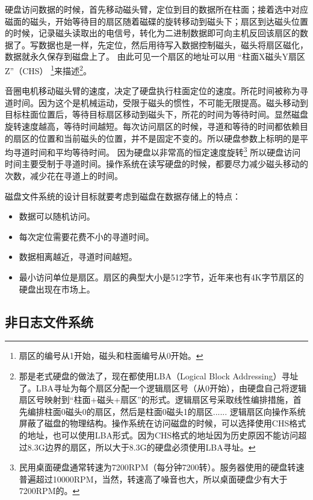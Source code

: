 
硬盘访问数据的时候，首先移动磁头臂，定位到目的数据所在柱面；接着选中对应磁面的磁头，开始等待目的扇区随着磁碟的旋转移动到磁头下；扇区到达磁头位置的时候，记录磁头读取出的电信号，转化为二进制数据即可向主机反回该扇区的数据了。写数据也是一样，先定位，然后用待写入数据控制磁头，磁头将扇区磁化，数据就永久保存到磁盘上了。
由此可见一个扇区的地址可以用 “柱面X磁头Y扇区Z”（CHS） \footnote{扇区的编号从1开始，磁头和柱面编号从0开始。}来描述\footnote{那是老式硬盘的做法了，现在都使用LBA（Logical Block Addressing）寻址了。LBA寻址为每个扇区分配一个逻辑扇区号（从0开始），由硬盘自己将逻辑扇区号映射到“柱面+磁头+扇区”的形式。逻辑扇区号采取线性编排措施，首先编排柱面0磁头0的扇区，然后是柱面0磁头1的扇区...... 逻辑扇区向操作系统屏蔽了磁盘的物理结构。操作系统在访问磁盘的时候，可以选择使用CHS格式的地址，也可以使用LBA形式。因为CHS格式的地址因为历史原因不能访问超过8.3G边界的扇区，所以大于8.3G的硬盘必须使用LBA寻址。}。


音圈电机移动磁头臂的速度，决定了硬盘执行柱面定位的速度。所花时间被称为寻道时间。因为这个是机械运动，受限于磁头的惯性，不可能无限提高。磁头移动到目标柱面位置后，等待目标扇区移动到磁头下，所花的时间为等待时间。显然磁盘旋转速度越高，等待时间越短。每次访问扇区的时候，寻道和等待的时间都依赖目的扇区的位置和当前磁头的位置，并不是固定不变的。所以硬盘参数上标明的是平均寻道时间和平均等待时间。
因为硬盘以非常高的恒定速度旋转\footnote{民用桌面硬盘通常转速为7200RPM（每分钟7200转）。服务器使用的硬盘转速普遍超过10000RPM，当然，转速高了噪音也大，所以桌面硬盘少有大于7200RPM的。}
所以硬盘访问时间主要受制于寻道时间。操作系统在读写硬盘的时候，都要尽力减少磁头移动的次数，减少花在寻道上的时间。


磁盘文件系统的设计目标就要考虑到磁盘在数据存储上的特点：
\begin{itemize}
\item 数据可以随机访问。
\item 每次定位需要花费不小的寻道时间。
\item 数据相离越近，寻道时间越短。
\item 最小访问单位是扇区。扇区的典型大小是512字节，近年来也有4K字节扇区的硬盘出现在市场上。
\end{itemize}

\subsection{非日志文件系统}

